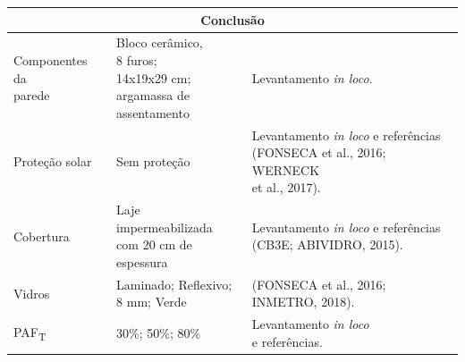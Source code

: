     \begin{table}[H]
        \centering
        \small
        \begin{tabular*}{\columnwidth}{@{\extracolsep{\fill}}lll}
        \hline
        \multicolumn{3}{c}{Conclusão}\\\hline
        \makecell[l]{Componentes da\\ parede}                          & \makecell[l]{Bloco cerâmico,\\ 8 furos; \\14x19x29 cm; \\argamassa de\\ assentamento} & Levantamento \textit{in loco}.                                                                                                                                         \\ \hline
        Proteção solar                                                 & Sem proteção                                                                          & \makecell[l]{Levantamento \textit{in loco} e referências\\ (FONSECA et al., 2016; WERNECK \\et al., 2017).}                                                            \\ \hline
        Cobertura                                                      & \makecell[l]{Laje impermeabilizada\\ com 20 cm de\\ espessura}                        & \makecell[l]{Levantamento \textit{in loco} e referências \\(CB3E; ABIVIDRO, 2015).}                                                                                    \\ \hline
        Vidros                                                         & \makecell[l]{Laminado; Reflexivo;\\ 8 mm; Verde}                                      & \makecell[l]{(FONSECA et al., 2016; \\INMETRO, 2018).}                                                                                                                   \\ \hline
        PAF\textsubscript{T}                                           & 30\%; 50\%; 80\%                                                                      & \makecell[l]{Levantamento \textit{in loco}\\ e referências.}                                                                                                             \\ \hline

\end{tabular*}
\end{table}
